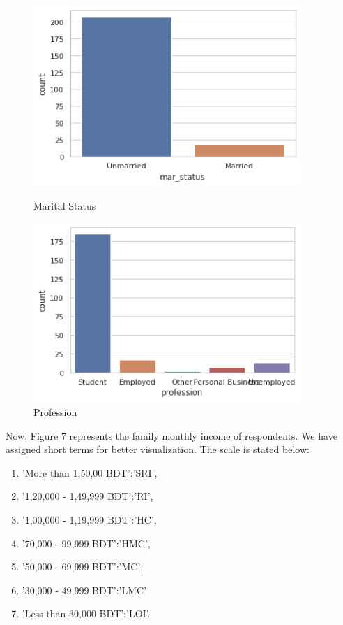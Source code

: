 \documentclass[12pt, english]{article}
\begin{document}
\begin{figure}[h]
    \centering
    \begin{minipage}{0.45\textwidth}
        \centering
        \includegraphics[width=0.9\textwidth]{images/maritial.png} %
        \caption{Marital Status}
    \end{minipage}\hfill
    \begin{minipage}{0.45\textwidth}
        \centering
        \includegraphics[width=0.9\textwidth]{images/profession.png} %
        \caption{Profession}
    \end{minipage}
\end{figure}

Now, Figure 7 represents the family monthly income of respondents. We have assigned short terms for better visualization. The scale is stated below: 
\begin{multicols}{2}
\begin{enumerate}
  \item 'More than 1,50,00 BDT':'SRI', \item '1,20,000 - 1,49,999 BDT':'RI',
  \item '1,00,000 - 1,19,999 BDT':'HC', \item '70,000 - 99,999 BDT':'HMC',
  \item '50,000 - 69,999 BDT':'MC',  \item '30,000 - 49,999 BDT':'LMC'
  \item 'Less than 30,000 BDT':'LOI'.
\end{enumerate}
\end{multicols}
\end{document}
